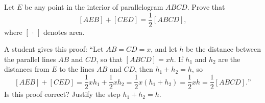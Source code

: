 Let $E$ be any point in the interior of parallelogram $ABCD$. Prove that
\[[AEB]+[CED]=\dfrac12[ABCD],\]
where $[\,\cdot\,]$ denotes area.

A student gives this proof: ``Let $AB=CD=x$, and let $h$ be the distance between the parallel lines $AB$ and $CD$, so that $[ABCD]=xh$. If $h_1$ and $h_2$ are the distances from $E$ to the lines $AB$ and $CD$, then $h_1+h_2=h$, so
\[[AEB]+[CED]=\dfrac12xh_1+\dfrac12xh_2=\dfrac12x(h_1+h_2)=\dfrac12xh=\dfrac12[ABCD].\text{''}\]
Is this proof correct? Justify the step $h_1+h_2=h$.
